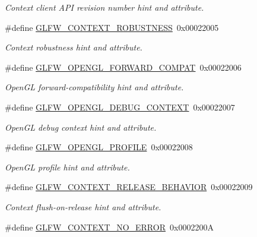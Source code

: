\begin{DoxyCompactItemize}
\begin{DoxyCompactList}\small\item\em Context client A\+PI revision number hint and attribute. \end{DoxyCompactList}\item 
\#define \mbox{\hyperlink{group__window_gade3593916b4c507900aa2d6844810e00}{G\+L\+F\+W\+\_\+\+C\+O\+N\+T\+E\+X\+T\+\_\+\+R\+O\+B\+U\+S\+T\+N\+E\+SS}}~0x00022005
\begin{DoxyCompactList}\small\item\em Context robustness hint and attribute. \end{DoxyCompactList}\item 
\#define \mbox{\hyperlink{group__window_ga13d24b12465da8b28985f46c8557925b}{G\+L\+F\+W\+\_\+\+O\+P\+E\+N\+G\+L\+\_\+\+F\+O\+R\+W\+A\+R\+D\+\_\+\+C\+O\+M\+P\+AT}}~0x00022006
\begin{DoxyCompactList}\small\item\em Open\+GL forward-\/compatibility hint and attribute. \end{DoxyCompactList}\item 
\#define \mbox{\hyperlink{group__window_ga87ec2df0b915201e950ca42d5d0831e1}{G\+L\+F\+W\+\_\+\+O\+P\+E\+N\+G\+L\+\_\+\+D\+E\+B\+U\+G\+\_\+\+C\+O\+N\+T\+E\+XT}}~0x00022007
\begin{DoxyCompactList}\small\item\em Open\+GL debug context hint and attribute. \end{DoxyCompactList}\item 
\#define \mbox{\hyperlink{group__window_ga44f3a6b4261fbe351e0b950b0f372e12}{G\+L\+F\+W\+\_\+\+O\+P\+E\+N\+G\+L\+\_\+\+P\+R\+O\+F\+I\+LE}}~0x00022008
\begin{DoxyCompactList}\small\item\em Open\+GL profile hint and attribute. \end{DoxyCompactList}\item 
\#define \mbox{\hyperlink{group__window_ga72b648a8378fe3310c7c7bbecc0f7be6}{G\+L\+F\+W\+\_\+\+C\+O\+N\+T\+E\+X\+T\+\_\+\+R\+E\+L\+E\+A\+S\+E\+\_\+\+B\+E\+H\+A\+V\+I\+OR}}~0x00022009
\begin{DoxyCompactList}\small\item\em Context flush-\/on-\/release hint and attribute. \end{DoxyCompactList}\item 
\#define \mbox{\hyperlink{group__window_ga5a52fdfd46d8249c211f923675728082}{G\+L\+F\+W\+\_\+\+C\+O\+N\+T\+E\+X\+T\+\_\+\+N\+O\+\_\+\+E\+R\+R\+OR}}~0x0002200A

\end{DoxyCompactItemize}

